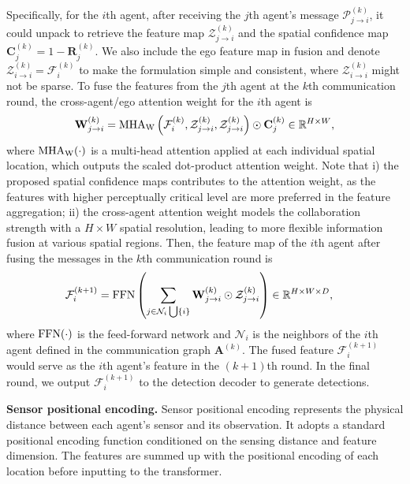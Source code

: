 \documentclass{article}
\begin{document}
Specifically, for the $i$th agent, after receiving the $j$th agent's message $\mathcal{P}_{j\rightarrow i}^{(k)}$, it could unpack to retrieve the feature map $\mathcal{Z}^{(k)}_{j\rightarrow i}$ and the spatial confidence map $\mathbf{C}^{(k)}_j = 1 - \mathbf{R}^{(k)}_j$. We also include the ego feature map in fusion and denote $\mathcal{Z}^{(k)}_{i\rightarrow i} = \mathcal{F}_{i}^{(k)}$ to make the formulation simple and consistent, where $\mathcal{Z}^{(k)}_{i\rightarrow i}$ might not be sparse. To fuse the features from the $j$th agent at the $k$th communication round, the cross-agent/ego attention weight for the $i$th agent is
\begin{equation}
    \label{eq:attention}
    \mathbf{W}_{j\rightarrow i}^{(k)} = {\rm MHA}_{\rm W}\left(\mathcal{F}_{i}^{(k)}, \mathcal{Z}_{j\rightarrow i}^{(k)}, \mathcal{Z}_{j\rightarrow i}^{(k)}\right) \odot  \mathbf{C}^{(k)}_j \in \mathbb{R}^{H\times W},
\end{equation}
where ${\rm MHA}_{\rm W}(\cdot)$ is a multi-head attention applied at each individual spatial location, which outputs the scaled dot-product attention weight. Note that i) the proposed spatial confidence maps contributes to the attention weight, as the features with higher perceptually critical level are more preferred in the feature aggregation; ii) the cross-agent attention weight models the collaboration strength with a $H\times W$ spatial resolution, leading to more flexible information fusion at various spatial regions. Then, the feature map of the $i$th agent after fusing the messages in the $k$th communication round is
\begin{align*}
\vspace{-4mm}
    \mathcal{F}_{i}^{(k+1)} &= {\rm FFN} \left( \sum_{j\in  \mathcal{N}_i\bigcup \{i\} } {\mathbf{W}}_{j\rightarrow i}^{(k)} \odot \mathcal{Z}_{j\rightarrow i}^{(k)}   \right) \in \mathbb{R}^{H\times W\times D},
\vspace{-4mm}
\end{align*}
where ${\rm FFN}(\cdot)$ is the feed-forward network and $\mathcal{N}_i$ is the neighbors of the $i$th agent defined in the communication graph $\mathbf{A}^{(k)}$. The fused feature $\mathcal{F}_{i}^{(k+1)}$ would serve as the $i$th agent's feature in the $(k+1)$th round. In the final round, we output $\mathcal{F}_{i}^{(k+1)}$ to the detection decoder to generate detections.

\textbf{Sensor positional encoding.} Sensor positional encoding represents the physical distance between each agent's sensor and its observation.  It adopts a standard positional encoding function conditioned on the sensing distance and feature dimension. The features are summed up with the positional encoding of each location before inputting to the transformer.
\end{document}
